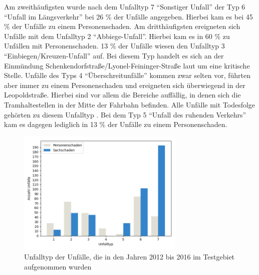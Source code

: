Am zweithäufigsten wurde nach dem Unfalltyp 7 \enquote{Sonstiger Unfall} der Typ 6 \enquote{Unfall im Längsverkehr} bei 26 \% der Unfälle angegeben. Hierbei kam es bei 45 \% der Unfälle zu einem Personenschaden. Am dritthäufigsten ereigneten sich Unfälle mit dem Unfalltyp 2 \enquote{Abbiege-Unfall}. Hierbei kam es in 60 \% zu Unfällen mit Personenschaden. 13 \% der Unfälle wiesen den Unfalltyp 3 \enquote{Einbiegen/Kreuzen-Unfall} auf. Bei diesem Typ handelt es sich an der Einmündung Schenkendorfstraße/Lyonel-Feininger-Straße laut \Textcite[S. 23]{Bruhn.2018} um eine kritische Stelle. Unfälle des Typs 4 \enquote{Überschreitunfälle} kommen zwar selten vor, führten aber immer zu einem Personenschaden und ereigneten sich überwiegend in der Leopoldstraße. Hierbei sind vor allem die Bereiche auffällig, in denen sich die Tramhaltestellen in der Mitte der Fahrbahn befinden. Alle Unfälle mit Todesfolge gehörten zu diesem Unfalltyp \parencite[S. 26f]{Bruhn.2018}. Bei dem Typ 5 \enquote{Unfall des ruhenden Verkehrs} kam es dagegen lediglich in 13 \% der Unfälle zu einem Personenschaden.

\begin{savenotes}
	\begin{figure}[H]
		\centering
		\includegraphics[width=8cm,height=6cm]{figures/Unfalltyp}
		\caption[Unfalltyp der Unfälle, die in den Jahren 2012 bis 2016 im Testgebiet aufgenommen wurden]{Unfalltyp der Unfälle, die in den Jahren 2012 bis 2016 im Testgebiet aufgenommen wurden}\label{fig:Unfalltyp}
	\end{figure}
\end{savenotes}

